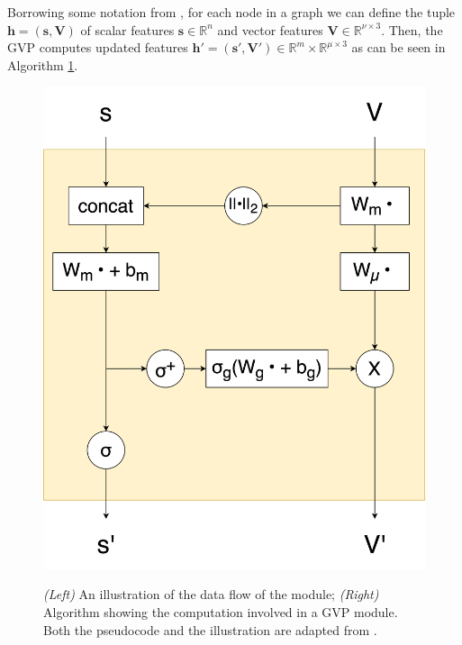Borrowing some notation from \cite{gvp1}, for each node in a graph we can define the tuple $\mathbf{h} = (\mathbf{s}, \mathbf{V})$ of scalar features $\mathbf{s}\in\mathbb{R}^{n}$ and vector features $\mathbf{V}\in \mathbb{R}^{\nu\times 3}$. Then, the GVP computes updated features $\mathbf{h}'=(\mathbf{s}', \mathbf{V}') \in \mathbb{R}^m\times\mathbb{R}^{\mu \times 3}$ as can be seen in Algorithm \ref{gvp-algo}.
\begin{figure}[!h]
    \begin{minipage}[b]{0.3\textwidth}
    \centering
    \includegraphics[width=\textwidth]{masters-report/figures/gvp.png}
    \label{fig:image}
  \end{minipage}
  \hfill
  \begin{minipage}[b]{0.65\textwidth}
    
  \end{minipage}
\caption{\textit{(Left)} An illustration of the data flow of the module; \textit{(Right)} Algorithm showing the computation involved in a GVP module.  Both the pseudocode and the illustration are adapted from \cite{gvp2}.}
\label{gvp-algo}
\end{figure}

